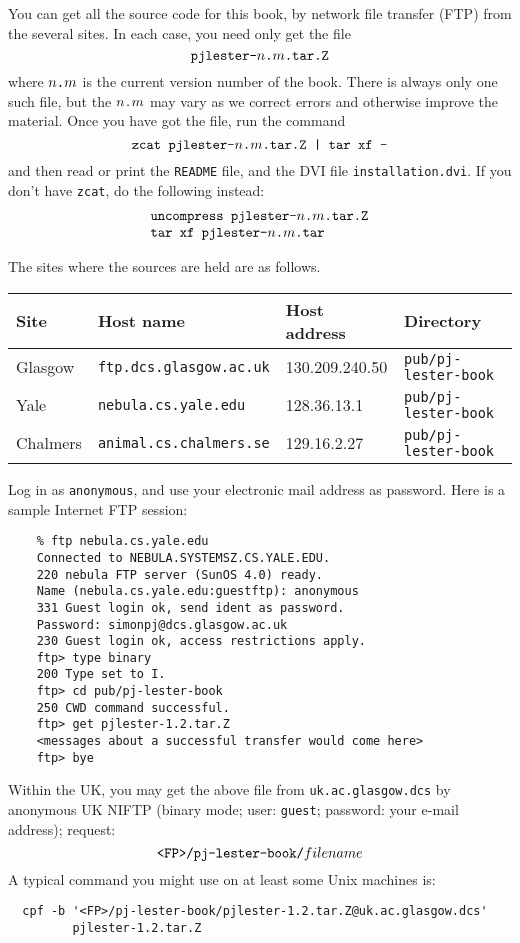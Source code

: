 
You can get all the source code for this book,
by network file transfer (FTP) from the
several sites.  In each case, you need only get the file
$$
\mbox{\tt pjlester-}n\mbox{\tt .}m\mbox{\tt .tar.Z}
$$
where $n\mbox{\tt .}m$ is the current version number of the book. There is always
only one such file, but the $n\mbox{\tt .}m$ may vary as we correct errors and
otherwise improve the material.  Once you have got the file, run the command
$$
\mbox{\tt zcat\ pjlester-}n\mbox{\tt .}m\mbox{\tt .tar.Z\ |\ tar\ xf\ -}
$$
and then read or print the \mbox{\tt README} file, and the DVI file \mbox{\tt installation.dvi}.
If you don't have \mbox{\tt zcat}, do the following instead:
$$
\begin{array}{l}
\mbox{\tt uncompress\ pjlester-}n\mbox{\tt .}m\mbox{\tt .tar.Z} \\
\mbox{\tt tar\ xf\ pjlester-}n\mbox{\tt .}m\mbox{\tt .tar}
\end{array}
$$

The sites where the sources are held are as follows.
\begin{center}
\begin{tabular}{|llll|}
\hline
Site    & Host name               & Host address & Directory \\
\hline
Glasgow & \mbox{\tt ftp.dcs.glasgow.ac.uk} & 130.209.240.50 & \mbox{\tt pub/pj-lester-book}\\
Yale    & \mbox{\tt nebula.cs.yale.edu}    & 128.36.13.1 & \mbox{\tt pub/pj-lester-book}  \\
Chalmers& \mbox{\tt animal.cs.chalmers.se} & 129.16.2.27 & \mbox{\tt pub/pj-lester-book} \\
\hline
\end{tabular}
\end{center}
Log in as \mbox{\tt anonymous}, and use your electronic mail address
as password.
Here is a sample Internet FTP session:
\begin{verbatim}
    % ftp nebula.cs.yale.edu
    Connected to NEBULA.SYSTEMSZ.CS.YALE.EDU.
    220 nebula FTP server (SunOS 4.0) ready.
    Name (nebula.cs.yale.edu:guestftp): anonymous
    331 Guest login ok, send ident as password.
    Password: simonpj@dcs.glasgow.ac.uk
    230 Guest login ok, access restrictions apply.
    ftp> type binary
    200 Type set to I.
    ftp> cd pub/pj-lester-book
    250 CWD command successful.
    ftp> get pjlester-1.2.tar.Z
    <messages about a successful transfer would come here>
    ftp> bye
\end{verbatim}
Within the UK, you may get the above file from
\mbox{\tt uk.ac.glasgow.dcs} by anonymous UK NIFTP 
(binary mode; user: \mbox{\tt guest}; password: your e-mail address);
request:
$$
\mbox{\tt <FP>/pj-lester-book/}filename
$$
A typical command you might use on at least some Unix machines is:
\begin{verbatim}
  cpf -b '<FP>/pj-lester-book/pjlester-1.2.tar.Z@uk.ac.glasgow.dcs' 
         pjlester-1.2.tar.Z
\end{verbatim}
